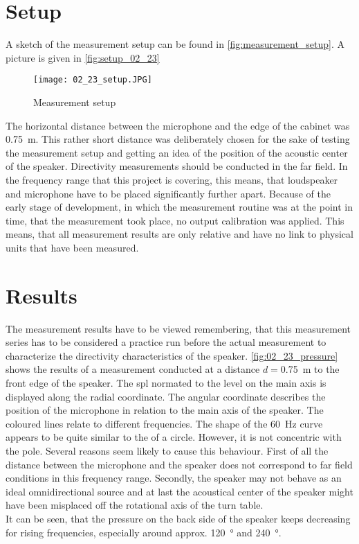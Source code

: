 \section*{Setup}
A sketch of the measurement setup can be found in \autoref{fig:measurement_setup}. A picture is given in \autoref{fig:setup_02_23}

\begin{figure}[htbp]
	\centering
	\texttt{[image: 02\_23\_setup.JPG]}
	\caption{Measurement setup}
		\label{fig:setup_02_23}
\end{figure}

The horizontal distance between the microphone and the edge of the cabinet was \SI{0.75}{\meter}. This rather short distance was deliberately chosen for the sake of testing the measurement setup and getting an idea of the position of the acoustic center of the speaker. Directivity measurements should be conducted in the far field. In the frequency range that this project is covering, this means, that loudspeaker and microphone have to be placed significantly further apart. Because of the early stage of development, in which the measurement routine was at the point in time, that the measurement took place, no output calibration was applied. This means, that all measurement results are only relative and have no link to physical units that have been measured.

\section*{Results}
The measurement results have to be viewed remembering, that this measurement series has to be considered a practice run before the actual measurement to characterize the directivity characteristics of the speaker. \autoref{fig:02_23_pressure} shows the results of a measurement conducted at a distance \(d=\)\SI{0.75}{\meter} to the front edge of the speaker. The \gls{spl} normated to the level on the main axis is displayed along the radial coordinate. The angular coordinate describes the position of the microphone in relation to the main axis of the speaker. The coloured lines relate to different frequencies.
The shape of the \SI{60}{\hertz} curve appears to be quite similar to the of a circle. However, it is not concentric with the pole. Several reasons seem likely to cause this behaviour.  First of all the distance between the microphone and the speaker does not correspond to far field conditions in this frequency range. Secondly, the speaker may not behave as an ideal omnidirectional source and at last the acoustical center of the speaker might have been misplaced off the rotational axis of the turn table.\\
It can be seen, that the pressure on the back side of the speaker keeps decreasing for rising frequencies, especially around approx. \SI{120}{\degree} and \SI{240}{\degree}.

